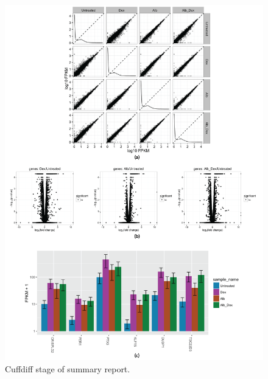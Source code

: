 \begin{figure}[!p]
\centering
\includegraphics[width=1\textwidth]{images/report_cuffdiff}
\caption[Cuffdiff stage of summary report]{
    Cuffdiff stage of summary report.
}
\label{fig:report-cuffdiff}
\end{figure}

